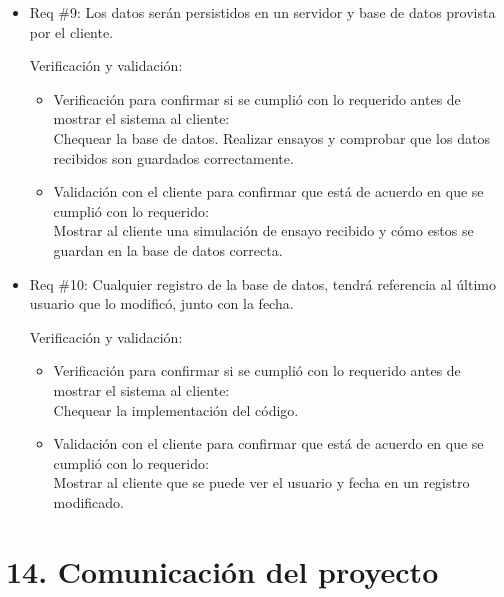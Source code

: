 \documentclass[11pt]{charter}
\begin{document}
\begin{itemize}
\item Req \#9: Los datos serán persistidos en un servidor y base de datos provista por el cliente.

Verificación y validación:

\begin{itemize}
\item Verificación para confirmar si se cumplió con lo requerido antes de mostrar el sistema al cliente:\\
Chequear la base de datos. Realizar ensayos y comprobar que los datos recibidos son guardados correctamente.
\item Validación con el cliente para confirmar que está de acuerdo en que se cumplió con lo requerido:\\
Mostrar al cliente una simulación de ensayo recibido y cómo estos se guardan en la base de datos correcta.
\end{itemize}


\item Req \#10: Cualquier registro de la base de datos, tendrá referencia al último usuario que lo modificó, junto con la fecha.

Verificación y validación:

\begin{itemize}
\item Verificación para confirmar si se cumplió con lo requerido antes de mostrar el sistema al cliente:\\
Chequear la implementación del código.
\item Validación con el cliente para confirmar que está de acuerdo en que se cumplió con lo requerido:\\
Mostrar al cliente que se puede ver el usuario y fecha en un registro modificado.
\end{itemize}

\end{itemize}


\section{14. Comunicación del proyecto}
\label{sec:comunicaciones}

\end{document}
